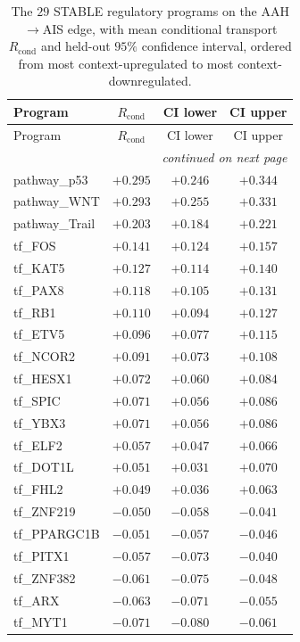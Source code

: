 \begin{longtable}{lccc}
  \caption[STABLE programs, AAH$\rightarrow$AIS]{The $29$ STABLE regulatory programs on the
  AAH$\rightarrow$AIS edge, with mean conditional transport $R_{\mathrm{cond}}$ and held-out $95\%$
  confidence interval, ordered from most context-upregulated to most context-downregulated.}
  \label{tab:app-c-stable-aah} \\
  \toprule
  Program & $R_{\mathrm{cond}}$ & CI lower & CI upper \\
  \midrule
  \endfirsthead
  \toprule
  Program & $R_{\mathrm{cond}}$ & CI lower & CI upper \\
  \midrule
  \endhead
  \midrule \multicolumn{4}{r}{\emph{continued on next page}} \\
  \endfoot
  \bottomrule
  \endlastfoot
  pathway\_p53 & $+0.295$ & $+0.246$ & $+0.344$ \\
  pathway\_WNT & $+0.293$ & $+0.255$ & $+0.331$ \\
  pathway\_Trail & $+0.203$ & $+0.184$ & $+0.221$ \\
  tf\_FOS & $+0.141$ & $+0.124$ & $+0.157$ \\
  tf\_KAT5 & $+0.127$ & $+0.114$ & $+0.140$ \\
  tf\_PAX8 & $+0.118$ & $+0.105$ & $+0.131$ \\
  tf\_RB1 & $+0.110$ & $+0.094$ & $+0.127$ \\
  tf\_ETV5 & $+0.096$ & $+0.077$ & $+0.115$ \\
  tf\_NCOR2 & $+0.091$ & $+0.073$ & $+0.108$ \\
  tf\_HESX1 & $+0.072$ & $+0.060$ & $+0.084$ \\
  tf\_SPIC & $+0.071$ & $+0.056$ & $+0.086$ \\
  tf\_YBX3 & $+0.071$ & $+0.056$ & $+0.086$ \\
  tf\_ELF2 & $+0.057$ & $+0.047$ & $+0.066$ \\
  tf\_DOT1L & $+0.051$ & $+0.031$ & $+0.070$ \\
  tf\_FHL2 & $+0.049$ & $+0.036$ & $+0.063$ \\
  tf\_ZNF219 & $-0.050$ & $-0.058$ & $-0.041$ \\
  tf\_PPARGC1B & $-0.051$ & $-0.057$ & $-0.046$ \\
  tf\_PITX1 & $-0.057$ & $-0.073$ & $-0.040$ \\
  tf\_ZNF382 & $-0.061$ & $-0.075$ & $-0.048$ \\
  tf\_ARX & $-0.063$ & $-0.071$ & $-0.055$ \\
  tf\_MYT1 & $-0.071$ & $-0.080$ & $-0.061$ \\

\end{longtable}
